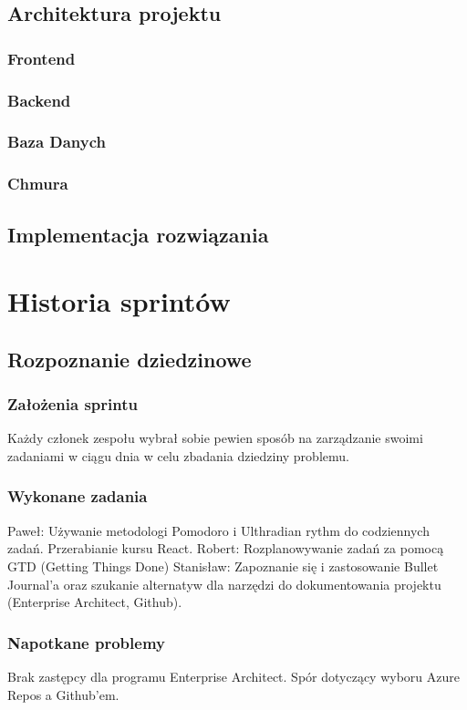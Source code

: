 \documentclass[a4paper,11pt]{report}
\begin{document}
\section {Architektura projektu}
\subsection{Frontend} 
\subsection{Backend}
\subsection{Baza Danych}
\subsection{Chmura}

\section {Implementacja rozwiązania}

\chapter {Historia sprintów}
\section {Rozpoznanie dziedzinowe}
\subsection {Założenia sprintu}
Każdy członek zespołu wybrał sobie pewien sposób na zarządzanie swoimi zadaniami w ciągu dnia w celu zbadania dziedziny problemu.
\subsection {Wykonane zadania}
Paweł: Używanie metodologi Pomodoro i Ulthradian rythm do codziennych zadań. Przerabianie kursu React.
Robert: Rozplanowywanie zadań za pomocą GTD (Getting Things Done)
Stanisław: Zapoznanie się i zastosowanie Bullet Journal'a oraz szukanie alternatyw dla narzędzi do dokumentowania projektu (Enterprise Architect, Github).
\subsection {Napotkane problemy}
Brak zastępcy dla programu Enterprise Architect. Spór dotyczący wyboru Azure Repos a Github'em.
\end{document}
